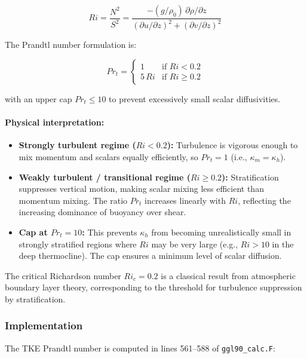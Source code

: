 \documentclass[12pt,letterpaper]{article}
\begin{document}
\begin{equation}
Ri = \frac{N^2}{S^2} = \frac{-(g/\rho_0) \, \partial\rho/\partial z}{(\partial u/\partial z)^2 + (\partial v/\partial z)^2}
\label{eq:richardson_number}
\end{equation}

The Prandtl number formulation is:

\begin{equation}
Pr_t = \begin{cases}
1 & \text{if } Ri < 0.2 \\
5 \, Ri & \text{if } Ri \geq 0.2
\end{cases}
\label{eq:prandtl_ri}
\end{equation}

with an upper cap $Pr_t \leq 10$ to prevent excessively small scalar diffusivities.

\paragraph{Physical interpretation:}
\begin{itemize}
\item \textbf{Strongly turbulent regime ($Ri < 0.2$):} Turbulence is vigorous enough to mix momentum and scalars equally efficiently, so $Pr_t = 1$ (i.e., $\kappa_m = \kappa_h$).
\item \textbf{Weakly turbulent / transitional regime ($Ri \geq 0.2$):} Stratification suppresses vertical motion, making scalar mixing less efficient than momentum mixing. The ratio $Pr_t$ increases linearly with $Ri$, reflecting the increasing dominance of buoyancy over shear.
\item \textbf{Cap at $Pr_t = 10$:} This prevents $\kappa_h$ from becoming unrealistically small in strongly stratified regions where $Ri$ may be very large (e.g., $Ri > 10$ in the deep thermocline). The cap ensures a minimum level of scalar diffusion.
\end{itemize}

The critical Richardson number $Ri_c = 0.2$ is a classical result from atmospheric boundary layer theory, corresponding to the threshold for turbulence suppression by stratification.

\subsubsection{Implementation}

The TKE Prandtl number is computed in lines 561--588 of \verb|ggl90_calc.F|:
\end{document}
